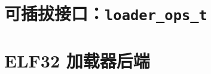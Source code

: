 \section{可插拔接口：\texttt{loader\_ops\_t}}
\label{sec:elf-interface}


\section{ELF32 加载器后端}
\label{sec:elf-backend}

%
%

